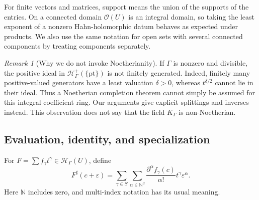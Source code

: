 \documentclass[11pt,oneside]{article}
\numberwithin{equation}{section}
\theoremstyle{definition}
\theoremstyle{remark}\newtheorem{remark}[theorem]{Remark}
\newcommand{\N}{\mathbb N}
\newcommand{\OO}{\mathcal O}
\newcommand{\HH}{\mathcal H_{\Gamma}}
\newcommand{\Hp}{\mathcal H^{+}_{\Gamma}}
\newcommand{\sh}{^{\sharp}}
\begin{document}
For finite vectors and matrices, support means the union of the supports of the entries. On a connected domain \(\OO(U)\) is an integral domain, so taking the least exponent of a nonzero Hahn-holomorphic datum behaves as expected under products. We also use the same notation for open sets with several connected components by treating components separately.

\begin{remark}[Why we do not invoke Noetherianity]\label{rem:nonnoetherian}
If \(\Gamma\) is nonzero and divisible, the positive ideal in \(\Hp(\{\mathrm{pt}\})\) is not finitely generated. Indeed, finitely many positive-valued generators have a least valuation \(\delta>0\), whereas \(t^{\delta/2}\) cannot lie in their ideal. Thus a Noetherian completion theorem cannot simply be assumed for this integral coefficient ring. Our arguments give explicit splittings and inverses instead. This observation does not say that the field \(K_\Gamma\) is non-Noetherian.
\end{remark}

\subsection{Evaluation, identity, and specialization}
For \(F=\sum f_\gamma t^\gamma\in\HH(U)\), define
\begin{equation}\label{eq:multieval}
 F\sh(c+\varepsilon)
 =\sum_{\gamma\in S}\sum_{\alpha\in\N^d}
 \frac{\partial^\alpha f_\gamma(c)}{\alpha!}
 t^\gamma\varepsilon^\alpha.
\end{equation}
Here \(\N\) includes zero, and multi-index notation has its usual meaning.
\end{document}
